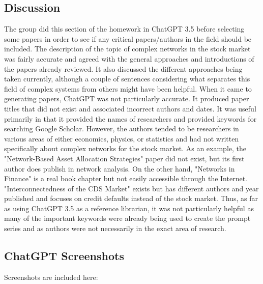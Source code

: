 \documentclass[12pt]{article}
\begin{document}
\subsection{Discussion}
The group did this section of the homework in ChatGPT 3.5 before selecting some papers in order to see if any critical papers/authors in the field should be included. The description of the topic of complex networks in the stock market was fairly accurate and agreed with the general approaches and introductions of the papers already reviewed. It also discussed the different approaches being taken currently, although a couple of sentences considering what separates this field of complex systems from others might have been helpful. When it came to generating papers, ChatGPT was not particularly accurate. It produced paper titles that did not exist and associated incorrect authors and dates. It was useful primarily in that it provided the names of researchers and provided keywords for searching Google Scholar. However, the authors tended to be researchers in various areas of either economics, physics, or statistics and had not written specifically about complex networks for the stock market. As an example, the "Network-Based Asset Allocation Strategies" paper did not exist, but its first author does publish in network analysis. On the other hand, "Networks in Finance" is a real book chapter but not easily accessible through the Internet. "Interconnectedness of the CDS Market" exists but has different authors and year published and focuses on credit defaults instead of the stock market. Thus, as far as using ChatGPT 3.5 as a reference librarian, it was not particularly helpful as many of the important keywords were already being used to create the prompt series and as authors were not necessarily in the exact area of research.


\subsection{ChatGPT Screenshots}
Screenshots are included here:
\end{document}

